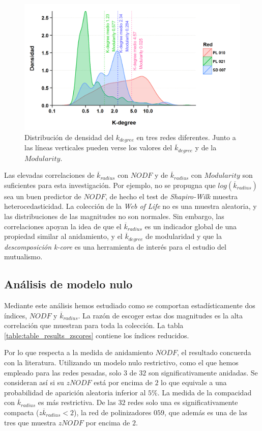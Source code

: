 \begin{figure}[h!]
\centering
\includegraphics[scale=0.85]{Figures/ESTATICA_density_plots.png}
\caption {Distribución de densidad del $k_{degree}$ en tres redes diferentes. Junto a las líneas verticales pueden verse los valores del $\overline {k}_{degree}$ y de la $Modularity$.}
\label{fig:ESTATICA_density_plots}
\end{figure}

Las elevadas correlaciones de $\overline {k}_{radius}$ con $NODF$ y de $\overline {k}_{radius}$ con $Modularity$ son suficientes para esta investigación. Por ejemplo, no se propugna que $log(\overline {k}_{radius})$ sea un buen predictor de $NODF$, de hecho el test de \textit{Shapiro-Wilk} muestra heterocedasticidad. La colección de la \textit{Web of Life} no es una muestra aleatoria, y las distribuciones de las magnitudes no son normales. Sin embargo, las correlaciones apoyan la idea de que el $\overline {k}_{radius}$ es un indicador global de una propiedad similar al anidamiento, y el $\overline {k}_{degree}$ de modularidad y que la \textit{descomposición k-core} es una herramienta de interés para el estudio del mutualismo.

\subsection{Análisis de modelo nulo}

Mediante este análisis hemos estudiado como se comportan estadísticamente dos índices, $NODF$ y $\overline k_{radius}$. La razón de escoger estas dos magnitudes es la alta correlación que
muestran para toda la colección. La tabla \ref{table:table_results_zscores} contiene los índices reducidos.

Por lo que respecta a la medida de anidamiento $NODF$, el resultado concuerda con la literatura. Utilizando un modelo nulo restrictivo, como el que hemos empleado para las redes pesadas, solo $3$ de $32$ son significativamente anidadas. Se consideran así si su $zNODF$ está por encima de $2$ lo que equivale a una probabilidad de aparición aleatoria inferior al $5\%$.
La medida de la compacidad con $\overline {k}_{radius}$ es más restrictiva. De las $32$ redes solo una es significativamente compacta ($z\overline {k}_{radius} < 2$), la red de polinizadores $059$, que además es una de las tres que muestra $zNODF$ por encima de $2$.

